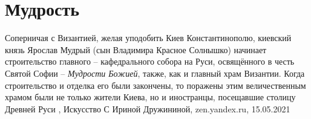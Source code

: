  
 
 
 
 
\chapter{Мудрость}
\label{sec:slova.mudrost}

Соперничая с Византией, желая уподобить Киев Константинополю, киевский князь
Ярослав Мудрый (сын Владимира Красное Солнышко) начинает строительство главного
– кафедрального собора на Руси, освящённого в честь Святой Софии – \emph{Мудрости
Божией}, также, как и главный храм Византии.  Когда строительство и отделка его
были закончены, то поражены этим величественным храмом были не только жители
Киева, но и иностранцы, посещавшие столицу Древней Руси
, 
Искусство С Ириной Дружининой, zen.yandex.ru, 15.05.2021
